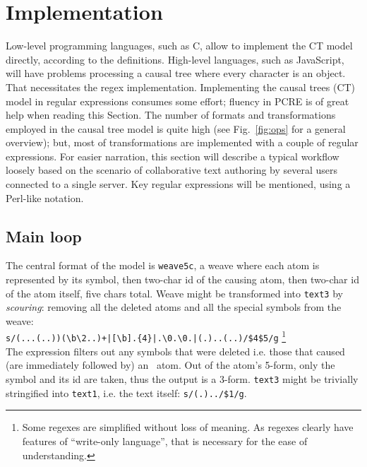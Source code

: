 \documentclass{acm_proc_article-sp}
\begin{document}
\section{Implementation}	   \label{sec:algos}

Low-level programming languages, such as C, allow to
implement the CT model directly, according to the definitions.
High-level languages, such as JavaScript, will have problems
processing a causal tree where every character is an object.
That necessitates the regex implementation.
Implementing the causal trees (CT) model in
regular expressions consumes some effort; fluency in PCRE
is of great help when reading this Section.
The number of formats and transformations employed in the
causal tree model is quite high (see Fig.~\ref{fig:ops}
for a general overview); but, most of transformations are
implemented with a couple of regular expressions. 
For easier narration, this section will describe a
typical workflow loosely based on the scenario of 
collaborative text authoring by several users connected
to a single server. Key regular expressions will be
mentioned, using a Perl-like notation.

\subsection{Main loop}

The central format of the model is {\tt weave5c}, a weave
where each atom is represented by its symbol, then
two-char id of the causing atom, then two-char
id of the atom itself, five chars total.
Weave might be transformed into {\tt text3} by 
\emph{scouring}: removing all the deleted atoms and all
the special symbols from the weave: \\
{\small \verb`s/(...(..))(\b\2..)+|[\b].{4}|.\0.\0.|(.)..(..)/$4$5/g`}
\footnote{Some regexes are simplified without loss of meaning. As regexes clearly have features of ``write-only language'', that is necessary for the ease of understanding.}\\
The expression filters out any symbols that were deleted
i.e. those that caused (are immediately followed by) an
\bsp ~atom.
Out of the atom's 5-form, only the symbol and its id are
taken, thus the output is a 3-form. {\tt text3} might be
trivially stringified into {\tt text1}, i.e. the text
itself: {\small \verb`s/(.)../$1/g`}.
\end{document}
